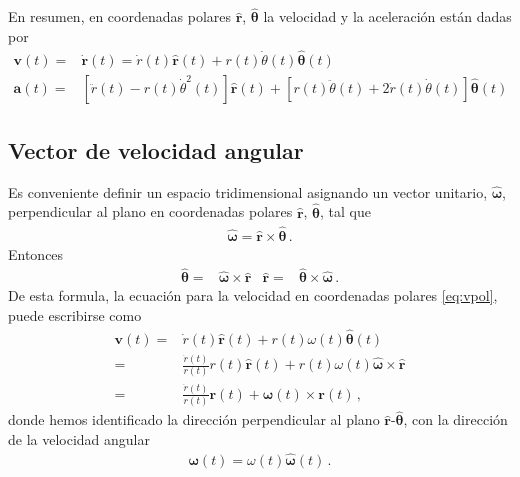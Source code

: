 \begin{frame}
  En resumen, en coordenadas polares $\hat{\mathbf{r}}$, $\hat{\boldsymbol{\theta}}$ la velocidad y la aceleración están dadas por
\begin{align*}
   \mathbf{v}(t)=&\dot{\mathbf{r}}(t)=\dot{r}(t)\hat{\mathbf{r}}(t)+
r(t)\dot{\theta}(t)\hat{\boldsymbol{\theta}}(t)\nonumber\\
 \mathbf{a}(t)=&
\left[\ddot{r}(t)-r(t)\dot{\theta}^2(t)\right]\hat{\mathbf{r}}(t)
+\left[r(t)\ddot{\theta}(t)+2\dot{r}(t)\dot{\theta}(t)  \right]\hat{\boldsymbol{\theta}}(t)
\end{align*}
\end{frame}

\subsection{Vector de velocidad angular}

Es conveniente definir un espacio tridimensional asignando un vector unitario,
$\hat{\boldsymbol{\omega}}$, perpendicular al plano en coordenadas polares
$\hat{\mathbf{r}}$, $\hat{\boldsymbol{\theta}}$, tal que
\begin{align*}
  \hat{\boldsymbol{\omega}}=\hat{\mathbf{r}}\times \hat{\boldsymbol{\theta}}\,.
\end{align*}
Entonces
\begin{align*}
 \hat{\boldsymbol{\theta}}=&\hat{\boldsymbol{\omega}}\times\hat{\mathbf{r}}& \hat{\mathbf{r}}=&\hat{\boldsymbol{\theta}}\times\hat{\boldsymbol{\omega}}\,.
\end{align*}
De esta formula, la ecuación para la velocidad en coordenadas polares \eqref{eq:vpol}, puede escribirse como
\begin{align}
    \mathbf{v}(t)
  =&\dot{r}(t)\hat{\mathbf{r}}(t)+r(t)\omega(t)\hat{\boldsymbol{\theta}}(t)\nonumber\\
  =&\frac{\dot{r}(t)}{r(t)}r(t)\hat{\mathbf{r}}(t)+r(t)\omega(t)\hat{\boldsymbol{\omega}}\times\hat{\mathbf{r}}\nonumber\\
  =&\frac{\dot{r}(t)}{r(t)}\mathbf{r}(t)+\boldsymbol{\omega}(t)\times\mathbf{r}(t)\,,
\end{align}
donde hemos identificado la dirección perpendicular al plano $\hat{\mathbf{r}}$-$\hat{\boldsymbol{\theta}}$, con la dirección de la velocidad angular
\begin{align}
  \boldsymbol{\omega}(t)=\omega(t)\hat{\boldsymbol{\omega}}(t)\,.
\end{align}




